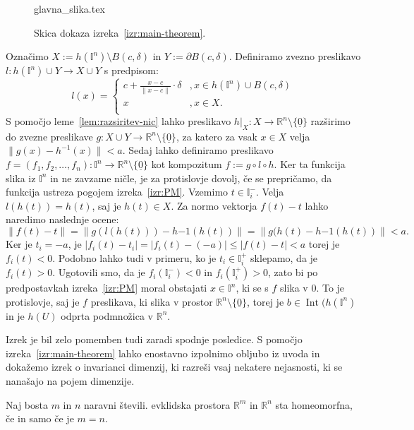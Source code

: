 \documentclass[mat1]{fmfdelo}
\newcommand{\R}{\mathbb R}
\DeclareMathOperator{\Int}{Int}
\newcommand{\I}{\mathbb I}
\newcommand{\0}{\underline{0}}
\begin{document}
\begin{dokaz}
\begin{figure}[h!]
	\centering
	{glavna_slika.tex}%
	\caption{Skica dokaza izreka~\ref{izr:main-theorem}.}
\end{figure}
Označimo $X := h(\I^n) \setminus B(c, \delta)$ in $Y := \partial B(c, \delta)$. Definiramo zvezno preslikavo $l : h(\I^n) \cup Y \to X \cup Y$ s predpisom:
\[  l(x) = \left\{
\begin{array}{ll}
	c + \frac{x - c}{\| x - c \|} \cdot \delta &, x \in h(\I^n) \cup B(c, \delta) \\
	x &, x \in X. \\
\end{array} 
\right. \]
S pomočjo leme~\ref{lem:razsiritev-nic} lahko preslikavo $h|_X : X \to \R^n \setminus \{ \0 \}$ razširimo do zvezne preslikave $g : X \cup Y \to \R^n \setminus \{ \0 \}$, za katero za vsak $x \in X$ velja $\| g(x) - h^{-1}(x) \| < a$.
Sedaj lahko definiramo preslikavo $f = (f_1, f_2, \dots, f_n) : \I^n \to \R^n \setminus \{ \0 \}$ kot kompozitum $f := g \circ l \circ h$. Ker ta funkcija slika iz $\I^n$ in ne zavzame ničle, je za protislovje dovolj, če se prepričamo, da funkcija ustreza pogojem izreka~\ref{izr:PM}. Vzemimo $t \in \I_i^-$. Velja $l(h(t)) = h(t)$, saj je $h(t) \in X$. Za normo vektorja $f(t) - t$ lahko naredimo naslednje ocene:
$$\| f(t) - t \| = \| g(l(h(t))) - h{-1}(h(t)) \| = \| g(h(t) - h{-1}(h(t)) \| < a.$$ 
Ker je $t_i = - a$, je $| f_i (t) - t_i | = | f_i (t) - ( - a) | \leq | f (t) - t | < a$ torej je $f_i(t) < 0$. Podobno lahko tudi v primeru, ko je $t_i \in \I_i^+$  sklepamo, da je $f_i(t) > 0$. Ugotovili smo, da je  $f_i(\I_i^-) < 0$ in $f_i(\I_i^+) > 0$, zato bi po predpostavkah izreka~\ref{izr:PM} moral obstajati $x \in \I^n$, ki se s $f$ slika v $0$. To je protislovje, saj je $f$ preslikava, ki slika v prostor $\R^n \setminus \{ \0 \}$, torej je $b \in \Int (h(\I^n)$ in je $h(U)$ odprta podmnožica v $\R^n$.
\end{dokaz}
Izrek je bil zelo pomemben tudi zaradi spodnje posledice.
S pomočjo izreka~\ref{izr:main-theorem} lahko enostavno izpolnimo obljubo iz uvoda in dokažemo izrek o invarianci dimenzij, ki razreši vsaj nekatere nejasnosti, ki se nanašajo na pojem dimenzije.
\begin{posledica}\label{izr:dim_izr}
Naj bosta $m$ in $n$ naravni števili. evklidska prostora $\R^m$ in $\R^n$ sta homeomorfna, če in samo če je $m = n$.
\end{posledica}
\end{document}
